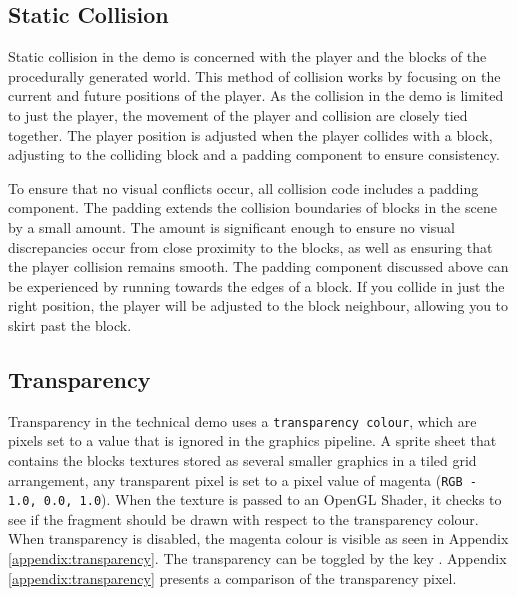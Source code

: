 \documentclass[a4paper,11pt,titlepage]{scrartcl}
\begin{document}
\subsection{Static Collision}
\label{section:collision}
Static collision in the demo is concerned with the player and the blocks of the procedurally generated world.  This method of collision works by focusing on the current and future positions of the player.  As the collision in the demo is limited to just the player, the movement of the player and collision are closely tied together.  The player position is adjusted when the player collides with a block, adjusting to the colliding block and a padding component to ensure consistency.

To ensure that no visual conflicts occur, all collision code includes a padding component.  The padding extends the collision boundaries of blocks in the scene by a small amount.   The amount is significant enough to ensure no visual discrepancies occur from close proximity to the blocks, as well as ensuring that the player collision remains smooth.  The padding component discussed above can be experienced by running towards the edges of a block.  If you collide in just the right position, the player will be adjusted to the block neighbour, allowing you to skirt past the block.
   
\subsection{Transparency}
\label{section:transparency}
Transparency in the technical demo uses a \texttt{transparency colour}, which are pixels set to a value that is ignored in the graphics pipeline.  A sprite sheet that contains the blocks textures stored as several smaller graphics in a tiled grid arrangement, any transparent pixel is set to a pixel value of magenta (\texttt{RGB - 1.0, 0.0, 1.0}).  When the texture is passed to an OpenGL Shader, it checks to see if the fragment should be drawn with respect to the transparency colour.  When transparency is disabled, the magenta colour is visible as seen in Appendix \ref{appendix:transparency}.
\vskip 2.5mm\noindent
The transparency can be toggled by the key .  Appendix \ref{appendix:transparency} presents a comparison of the transparency pixel.
    
\end{document}
